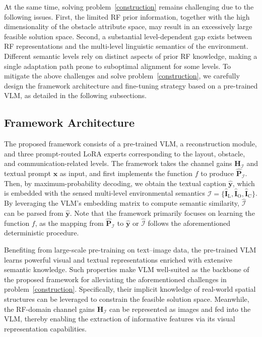 \documentclass[journal,10pt,twocolumn]{IEEEtran}
\newcommand\IC{\ensuremath{\mathcal{I}}}
\newcommand\PB{\ensuremath{\bm{P}}}
\newcommand\xB{\ensuremath{\bm{x}}}
\newcommand\yB{\ensuremath{\bm{y}}}
\newcommand\HF{\ensuremath{\mathbf{H}}}
\newcommand\FIF{\ensuremath{\mathbf{I}}}
\newcommand\CR{\ensuremath{\mathrm{C}}}
\newcommand\LR{\ensuremath{\mathrm{L}}}
\newcommand\ROR{\ensuremath{\mathrm{O}}}
\newcommand{\wh}{\widehat}
\begin{document}
At the same time, solving problem~\eqref{construction} remains challenging due to the following issues. First, the limited RF prior information, together with the high dimensionality of the obstacle attribute space, may result in an excessively large feasible solution space. Second, a substantial level-dependent gap exists between RF representations and the multi-level linguistic semantics of the environment. Different semantic levels rely on distinct aspects of prior RF knowledge, making a single adaptation path prone to suboptimal alignment for some levels. To mitigate the above challenges and solve problem~\eqref{construction}, we carefully design the framework architecture and fine-tuning strategy based on a pre-trained VLM, as detailed in the following subsections.

\subsection{Framework Architecture}

The proposed framework consists of a pre-trained VLM, a reconstruction module, and three prompt-routed LoRA experts corresponding to the layout, obstacle, and communication-related levels. The framework takes the channel gains $\HF_{\IC}$ and textual prompt $\xB$ as input, and first implements the function $f$ to produce $\wh{\PB}_{\IC}$. Then, by maximum-probability decoding, we obtain the textual caption $\wh{\yB}$, which is embedded with the sensed multi-level environmental semantics $\wh{\IC}=\{\wh{\FIF}_{\LR},\wh{\FIF}_{\ROR},\wh{\FIF}_{\CR}\}$. By leveraging the VLM’s  embedding matrix to compute semantic similarity, $\wh{\IC}$ can be parsed from $\wh{\yB}$. Note that the framework primarily focuses on learning the function $f$, as the mapping from $\wh{\PB}_{\IC}$ to $\wh{\yB}$ or $\wh{\IC}$ follows the aforementioned deterministic procedure.


Benefiting from large-scale pre-training on text–image data, the pre-trained VLM learns powerful visual and textual representations enriched with extensive semantic knowledge. Such properties make VLM well-suited as the backbone of the proposed framework for alleviating the aforementioned challenges in problem~\eqref{construction}. Specifically, their implicit knowledge of real-world spatial structures can be leveraged to constrain the feasible solution space. Meanwhile, the RF-domain channel gains $\HF_{\IC}$ can be represented as images and fed into the VLM, thereby enabling the extraction of informative features via its visual representation capabilities.
\end{document}
